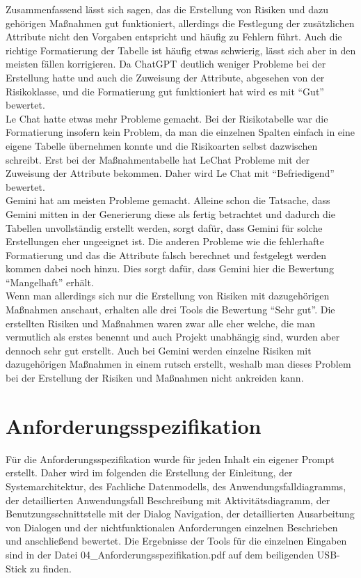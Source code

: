 Zusammenfassend lässt sich sagen, das die Erstellung von Risiken und dazu gehörigen Maßnahmen gut funktioniert, allerdings die 
Festlegung der zusätzlichen Attribute nicht den Vorgaben entspricht und häufig zu Fehlern führt. Auch die richtige Formatierung 
der Tabelle ist häufig etwas schwierig, lässt sich aber in den meisten fällen korrigieren. Da ChatGPT deutlich weniger Probleme 
bei der Erstellung hatte und auch die Zuweisung der Attribute, abgesehen von der Risikoklasse, und die Formatierung gut funktioniert
hat wird es mit ``Gut'' bewertet.\\
Le Chat hatte etwas mehr Probleme gemacht. Bei der Risikotabelle war die Formatierung insofern kein Problem, da man die einzelnen 
Spalten einfach in eine eigene Tabelle übernehmen konnte und die Risikoarten selbst dazwischen schreibt. Erst bei der Maßnahmentabelle
hat LeChat Probleme mit der Zuweisung der Attribute bekommen. Daher wird Le Chat mit ``Befriedigend'' bewertet.\\
Gemini hat am meisten Probleme gemacht. Alleine schon die Tatsache, dass Gemini mitten in der Generierung diese als fertig betrachtet 
und dadurch die Tabellen unvollständig erstellt werden, sorgt dafür, dass Gemini für solche Erstellungen eher ungeeignet ist. Die 
anderen Probleme wie die fehlerhafte Formatierung und das die Attribute falsch berechnet und festgelegt werden kommen dabei noch hinzu.
Dies sorgt dafür, dass Gemini hier die Bewertung ``Mangelhaft'' erhält.\\

Wenn man allerdings sich nur die Erstellung von Risiken mit dazugehörigen Maßnahmen anschaut, erhalten alle drei Tools die Bewertung 
``Sehr gut''. Die erstellten Risiken und Maßnahmen waren zwar alle eher welche, die man vermutlich als erstes benennt und auch 
Projekt unabhängig sind, wurden aber dennoch sehr gut erstellt. Auch bei Gemini werden einzelne Risiken mit dazugehörigen Maßnahmen 
in einem rutsch erstellt, weshalb man dieses Problem bei der Erstellung der Risiken und Maßnahmen nicht ankreiden kann.

\section{Anforderungsspezifikation}  \label{CompAnforderungsspezifikation}

Für die Anforderungsspezifikation wurde für jeden Inhalt ein eigener Prompt erstellt. Daher wird im folgenden die Erstellung der Einleitung, 
der Systemarchitektur, des Fachliche Datenmodells, des Anwendungsfalldiagramms, der detaillierten Anwendungsfall Beschreibung mit Aktivitätsdiagramm, 
der Benutzungsschnittstelle mit der Dialog Navigation, der detaillierten Ausarbeitung von Dialogen und der nichtfunktionalen Anforderungen einzelnen
Beschrieben und anschließend bewertet. Die Ergebnisse der Tools für die einzelnen Eingaben sind in der Datei 04\_Anforderungsspezifikation.pdf auf 
dem beiligenden USB-Stick zu finden.\\

